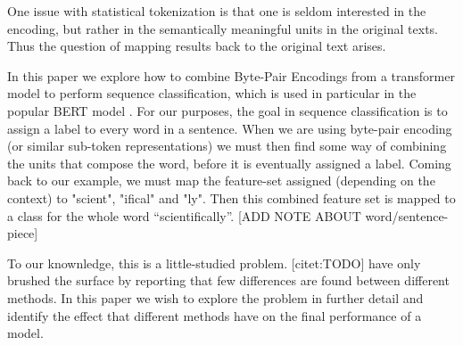 \documentclass[11pt]{article}
\newcommand\citep{\shortcite}
\begin{document}
            One issue with statistical tokenization is that one is
     seldom interested in the encoding, but rather in the semantically
     meaningful units in the original texts. Thus the question of
     mapping results back to the original text arises.
        
    	In this paper we explore how to combine Byte-Pair Encodings
     from a transformer model to perform sequence classification,
     which is used in particular in the popular BERT model
     \citep{devlin2018bert}. For our purposes, the goal in sequence
     classification is to assign a label to every word in a
     sentence. When we are using byte-pair encoding (or similar
     sub-token representations) we must then find some way of
     combining the units that compose the word, before it is eventually
     assigned a label. Coming back to our example, we must map the
     feature-set assigned (depending on the context) to "scient",
     "ifical" and "ly". Then this combined feature set is mapped to a
     class for the whole word ``scientifically''. [ADD NOTE ABOUT word/sentence-piece]

    	To our knownledge, this is a little-studied
     problem. [citet:TODO] have only brushed the surface by reporting
     that few differences are found between different methods. In this
     paper we wish to explore the problem in further detail and
     identify the effect that different methods have on the final
     performance of a model.

    
	
    
\end{document}
